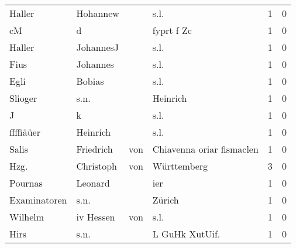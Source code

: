 \begin{tabular}{llllrr}
                   Haller &                           Hohannew &             &                                        s.l. &          1 &         0 \\
                       cM &                                  d &             &                                  fyprt f Zc &          1 &         0 \\
                   Haller &                          JohannesJ &             &                                        s.l. &          1 &         0 \\
                     Fius &                           Johannes &             &                                        s.l. &          1 &         0 \\
                     Egli &                             Bobias &             &                                        s.l. &          1 &         0 \\
                  Slioger &                               s.n. &             &                                    Heinrich &          1 &         0 \\
                        J &                                  k &             &                                        s.l. &          1 &         0 \\
                ffffiäüer &                           Heinrich &             &                                        s.l. &          1 &         0 \\
                    Salis &                          Friedrich &         von &                   Chiavenna oriar fismaclen &          1 &         0 \\
                     Hzg. &                          Christoph &         von &                                 Württemberg &          3 &         0 \\
                  Pournas &                            Leonard &             &                                         ier &          1 &         0 \\
             Examinatoren &                               s.n. &             &                                      Zürich &          1 &         0 \\
                  Wilhelm &                         iv  Hessen &         von &                                        s.l. &          1 &         0 \\
                     Hirs &                               s.n. &             &                             L GuHk XutUif.  &          1 &         0 \\

\end{tabular}
